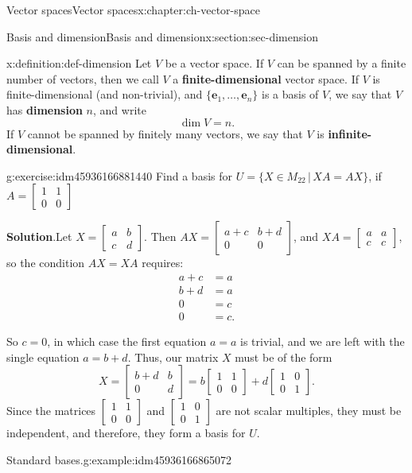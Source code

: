 \documentclass[oneside,10pt,]{book}
\newcommand{\blocktitlefont}{\relax}
\newcommand{\terminology}[1]{\textbf{#1}}
\numberwithin{equation}{section}
\newcommand{\bbm}{\begin{bmatrix}}
\newcommand{\ebm}{\end{bmatrix}}
\newcommand{\amp}{&}
\begin{document}
\begin{chapterptx}{Vector spaces}{}{Vector spaces}{}{}{x:chapter:ch-vector-space}
\begin{sectionptx}{Basis and dimension}{}{Basis and dimension}{}{}{x:section:sec-dimension}
\begin{definition}{}{x:definition:def-dimension}
Let \(V\) be a vector space. If \(V\) can be spanned by a finite number of vectors, then we call \(V\) a \terminology{finite-dimensional} vector space. If \(V\) is finite-dimensional (and non-trivial), and \(\{\mathbf{e}_1,\ldots, \mathbf{e}_n\}\) is a basis of \(V\), we say that \(V\) has \terminology{dimension} \(n\), and write%
\begin{equation*}
\dim V = n\text{.}
\end{equation*}
If \(V\) cannot be spanned by finitely many vectors, we say that \(V\) is \terminology{infinite-dimensional}.%
\end{definition}
\begin{inlineexercise}{}{g:exercise:idm45936166881440}%
Find a basis for \(U=\{X\in M_{22} \,|\, XA = AX\}\), if \(A = \bbm 1\amp 1\\0\amp 0\ebm\)%
\par\smallskip%
\noindent\textbf{\blocktitlefont Solution}.\label{g:solution:idm45936166873280}{}\hypertarget{g:solution:idm45936166873280}{}\quad{}Let \(X=\bbm a\amp b\\c\amp d\ebm\). Then \(AX = \bbm a+c\amp b+d\\0\amp 0\ebm\), and \(XA = \bbm a\amp a\\c\amp c\ebm\), so the condition \(AX=XA\) requires:%
\begin{align*}
a+c \amp = a\\
b+d \amp = a\\
0 \amp = c\\
0 \amp =c\text{.}
\end{align*}
%
\par
So \(c=0\), in which case the first equation \(a=a\) is trivial, and we are left with the single equation \(a=b+d\). Thus, our matrix \(X\) must be of the form%
\begin{equation*}
X = \bbm b+d \amp b\\0\amp d\ebm = b\bbm 1\amp 1\\0\amp 0\ebm + d\bbm 1\amp 0\\0\amp 1\ebm\text{.}
\end{equation*}
Since the matrices \(\bbm 1\amp 1\\0\amp 0\ebm\) and \(\bbm 1\amp 0\\0\amp 1\ebm\) are not scalar multiples, they must be independent, and therefore, they form a basis for \(U\).%
\end{inlineexercise}%
\begin{example}{Standard bases.}{g:example:idm45936166865072}%

\end{example}
\end{sectionptx}
\end{chapterptx}
\end{document}
